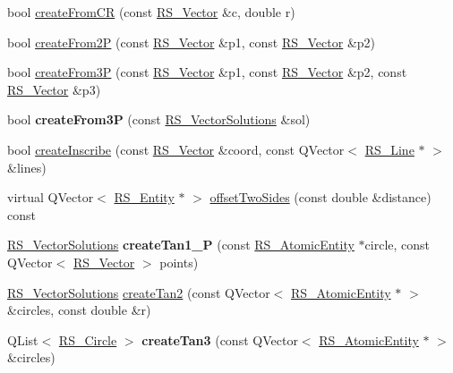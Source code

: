 \begin{DoxyCompactItemize}
\item 
bool \hyperlink{classRS__Circle_a501aadb9dc900efbbcdd301565b4dd30}{create\-From\-C\-R} (const \hyperlink{classRS__Vector}{R\-S\-\_\-\-Vector} \&c, double r)
\item 
bool \hyperlink{classRS__Circle_a39170ca1459e713c980712a79c241611}{create\-From2\-P} (const \hyperlink{classRS__Vector}{R\-S\-\_\-\-Vector} \&p1, const \hyperlink{classRS__Vector}{R\-S\-\_\-\-Vector} \&p2)
\item 
bool \hyperlink{classRS__Circle_a78529f7f3cf8faaf8c3106be6e674fad}{create\-From3\-P} (const \hyperlink{classRS__Vector}{R\-S\-\_\-\-Vector} \&p1, const \hyperlink{classRS__Vector}{R\-S\-\_\-\-Vector} \&p2, const \hyperlink{classRS__Vector}{R\-S\-\_\-\-Vector} \&p3)
\item 
\hypertarget{classRS__Circle_afe6b067435110acbfa48e709146459e4}{bool {\bfseries create\-From3\-P} (const \hyperlink{classRS__VectorSolutions}{R\-S\-\_\-\-Vector\-Solutions} \&sol)}\label{classRS__Circle_afe6b067435110acbfa48e709146459e4}

\item 
bool \hyperlink{classRS__Circle_a871ad46f6cd3144d92aa65b4e517832f}{create\-Inscribe} (const \hyperlink{classRS__Vector}{R\-S\-\_\-\-Vector} \&coord, const Q\-Vector$<$ \hyperlink{classRS__Line}{R\-S\-\_\-\-Line} $\ast$ $>$ \&lines)
\item 
virtual Q\-Vector$<$ \hyperlink{classRS__Entity}{R\-S\-\_\-\-Entity} $\ast$ $>$ \hyperlink{classRS__Circle_ad797733ded3a54d310d83208f9810078}{offset\-Two\-Sides} (const double \&distance) const 
\item 
\hypertarget{classRS__Circle_aadc0d52f103ba13c25f4aa642072417c}{\hyperlink{classRS__VectorSolutions}{R\-S\-\_\-\-Vector\-Solutions} {\bfseries create\-Tan1\-\_\-P} (const \hyperlink{classRS__AtomicEntity}{R\-S\-\_\-\-Atomic\-Entity} $\ast$circle, const Q\-Vector$<$ \hyperlink{classRS__Vector}{R\-S\-\_\-\-Vector} $>$ points)}\label{classRS__Circle_aadc0d52f103ba13c25f4aa642072417c}

\item 
\hyperlink{classRS__VectorSolutions}{R\-S\-\_\-\-Vector\-Solutions} \hyperlink{classRS__Circle_a5022a997d036b9253abf2a306a7fe167}{create\-Tan2} (const Q\-Vector$<$ \hyperlink{classRS__AtomicEntity}{R\-S\-\_\-\-Atomic\-Entity} $\ast$ $>$ \&circles, const double \&r)
\item 
\hypertarget{classRS__Circle_a599c89238ab21e0a3a903c43a3477ad7}{Q\-List$<$ \hyperlink{classRS__Circle}{R\-S\-\_\-\-Circle} $>$ {\bfseries create\-Tan3} (const Q\-Vector$<$ \hyperlink{classRS__AtomicEntity}{R\-S\-\_\-\-Atomic\-Entity} $\ast$ $>$ \&circles)}\label{classRS__Circle_a599c89238ab21e0a3a903c43a3477ad7}


\end{DoxyCompactItemize}
